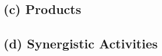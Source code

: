 \documentclass[svgnames,11pt]{article}
\begin{document}
\subsection*{(c) Products}

\nocite{cao2017rapid}
\nocite{seetharam2013whole}
\nocite{xue2015crispr}
\nocite{seetharam2010survey}
\nocite{seetharam2013study}
\nocite{seetharam2012whole}
\nocite{seetharam2015ncbi}



\subsection*{(d) Synergistic Activities}
\end{document}
